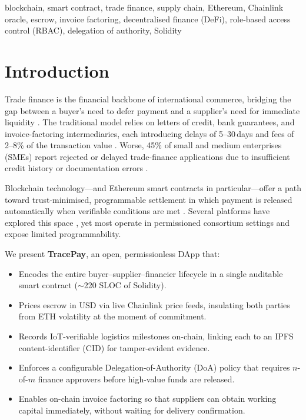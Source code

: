 \documentclass[conference]{IEEEtran}
\begin{document}
\begin{IEEEkeywords}
blockchain, smart contract, trade finance, supply chain,
Ethereum, Chainlink oracle, escrow, invoice factoring,
decentralised finance (DeFi), role-based access control (RBAC),
delegation of authority, Solidity
\end{IEEEkeywords}

\section{Introduction}
\label{sec:intro}

Trade finance is the financial backbone of international commerce,
bridging the gap between a buyer's need to defer payment and a
supplier's need for immediate liquidity \cite{icc2022}.
The traditional model relies on letters of credit, bank guarantees,
and invoice-factoring intermediaries, each introducing delays of
5--30\,days and fees of 2--8\% of the transaction value \cite{bis2019}.
Worse, 45\% of small and medium enterprises (SMEs) report rejected or
delayed trade-finance applications due to insufficient credit history
or documentation errors \cite{adb2021sme}.

Blockchain technology---and Ethereum smart contracts in particular---offer
a path toward trust-minimised, programmable settlement in which
payment is released automatically when verifiable conditions are met
\cite{nakamoto2008,buterin2014}.
Several platforms have explored this space
\cite{tracr2020,wetrade2022,contour2020}, yet most operate in
permissioned consortium settings and expose limited programmability.

We present \textbf{TracePay}, an open, permissionless DApp that:
\begin{itemize}
  \item Encodes the entire buyer--supplier--financier lifecycle in a
        single auditable smart contract ($\sim$220 SLOC of Solidity).
  \item Prices escrow in USD via live Chainlink price feeds,
        insulating both parties from ETH volatility at the moment
        of commitment.
  \item Records IoT-verifiable logistics milestones on-chain, linking
        each to an IPFS content-identifier (CID) for tamper-evident
        evidence.
  \item Enforces a configurable Delegation-of-Authority (DoA) policy
        that requires $n$-of-$m$ finance approvers before high-value
        funds are released.
  \item Enables on-chain invoice factoring so that suppliers can
        obtain working capital immediately, without waiting for
        delivery confirmation.
\end{itemize}
\end{document}
